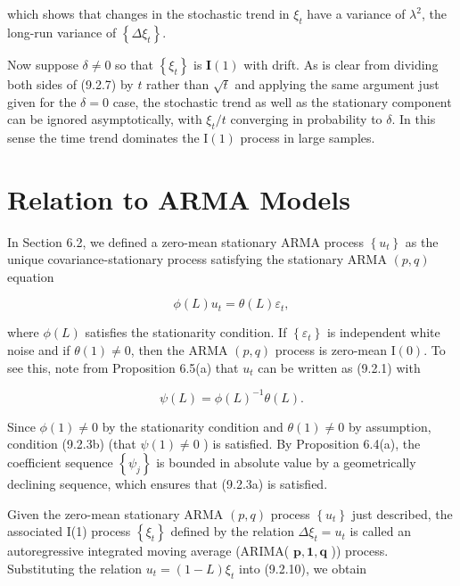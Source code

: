 \documentclass[10pt]{article}
\begin{document}
which shows that changes in the stochastic trend in $\xi_{t}$ have a variance of $\lambda^{2}$, the long-run variance of $\left\{\Delta \xi_{t}\right\}$.

Now suppose $\delta \neq 0$ so that $\left\{\xi_{t}\right\}$ is $\mathbf{I}(1)$ with drift. As is clear from dividing both sides of (9.2.7) by $t$ rather than $\sqrt{t}$ and applying the same argument just given for the $\delta=0$ case, the stochastic trend as well as the stationary component can be ignored asymptotically, with $\xi_{t} / t$ converging in probability to $\delta$. In this sense the time trend dominates the $\mathrm{I}(1)$ process in large samples.

\section*{Relation to ARMA Models}
In Section 6.2, we defined a zero-mean stationary ARMA process $\left\{u_{t}\right\}$ as the unique covariance-stationary process satisfying the stationary ARMA $(p, q)$ equation


\begin{equation*}
\phi(L) u_{t}=\theta(L) \varepsilon_{t}, \tag{9.2.10}
\end{equation*}


where $\phi(L)$ satisfies the stationarity condition. If $\left\{\varepsilon_{t}\right\}$ is independent white noise and if $\theta(1) \neq 0$, then the ARMA $(p, q)$ process is zero-mean $\mathrm{I}(0)$. To see this, note from Proposition 6.5(a) that $u_{t}$ can be written as (9.2.1) with


\begin{equation*}
\psi(L)=\phi(L)^{-1} \theta(L) . \tag{9.2.11}
\end{equation*}


Since $\phi(1) \neq 0$ by the stationarity condition and $\theta(1) \neq 0$ by assumption, condition (9.2.3b) (that $\psi(1) \neq 0$ ) is satisfied. By Proposition 6.4(a), the coefficient sequence $\left\{\psi_{j}\right\}$ is bounded in absolute value by a geometrically declining sequence, which ensures that (9.2.3a) is satisfied.

Given the zero-mean stationary ARMA $(p, q)$ process $\left\{u_{t}\right\}$ just described, the associated I(1) process $\left\{\xi_{t}\right\}$ defined by the relation $\Delta \xi_{t}=u_{t}$ is called an autoregressive integrated moving average (ARIMA( $\boldsymbol{p}, \mathbf{1}, \boldsymbol{q}$ )) process. Substituting the relation $u_{t}=(1-L) \xi_{t}$ into (9.2.10), we obtain
\end{document}
